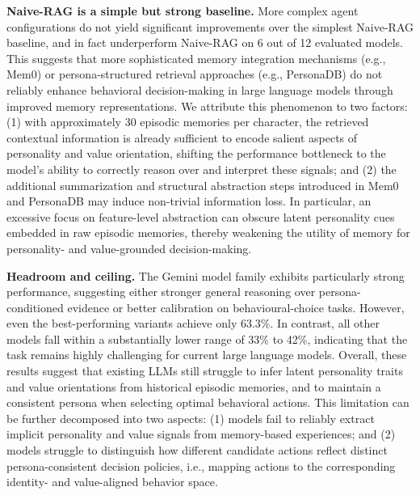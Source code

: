 \documentclass{article}
\begin{document}
\textbf{Naive-RAG is a simple but strong baseline.} 
More complex agent configurations do not yield significant improvements over the simplest Naive-RAG baseline, and in fact underperform Naive-RAG on 6 out of 12 evaluated models. This suggests that more sophisticated memory integration mechanisms (e.g., Mem0) or persona-structured retrieval approaches (e.g., PersonaDB) do not reliably enhance behavioral decision-making in large language models through improved memory representations. We attribute this phenomenon to two factors: (1) with approximately 30 episodic memories per character, the retrieved contextual information is already sufficient to encode salient aspects of personality and value orientation, shifting the performance bottleneck to the model’s ability to correctly reason over and interpret these signals; and (2) the additional summarization and structural abstraction steps introduced in Mem0 and PersonaDB may induce non-trivial information loss. In particular, an excessive focus on feature-level abstraction can obscure latent personality cues embedded in raw episodic memories, thereby weakening the utility of memory for personality- and value-grounded decision-making.

\textbf{Headroom and ceiling.} 
The Gemini model family exhibits particularly strong performance, suggesting either stronger general reasoning over persona-conditioned evidence or better calibration on behavioural-choice tasks. However, even the best-performing variants achieve only 63.3\%. In contrast, all other models fall within a substantially lower range of 33\% to 42\%, indicating that the task remains highly challenging for current large language models. Overall, these results suggest that existing LLMs still struggle to infer latent personality traits and value orientations from historical episodic memories, and to maintain a consistent persona when selecting optimal behavioral actions. This limitation can be further decomposed into two aspects: (1) models fail to reliably extract implicit personality and value signals from memory-based experiences; and (2) models struggle to distinguish how different candidate actions reflect distinct persona-consistent decision policies, i.e., mapping actions to the corresponding identity- and value-aligned behavior space.
\end{document}
